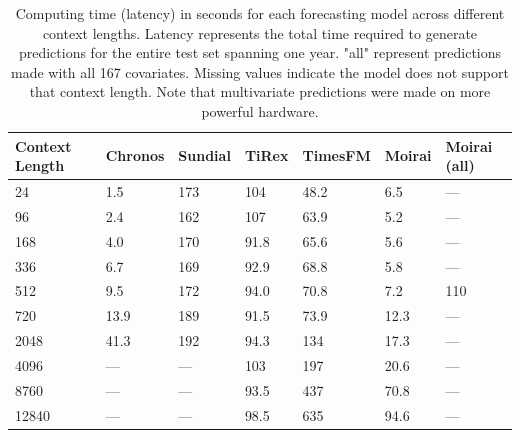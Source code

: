 \begin{table}[H]
\centering
\begin{tabular}{lllllll}
\toprule
\textbf{Context Length} &  \textbf{Chronos} &  \textbf{Sundial} &  \textbf{TiRex} &  \textbf{TimesFM} &  \textbf{Moirai} &  \textbf{Moirai (all)} \\
\midrule
24             & 1.5 & 173 & 104 & 48.2 & 6.5 & {---} \\
96             & 2.4 & 162 & 107 & 63.9 & 5.2 & {---} \\
168            & 4.0 & 170 & 91.8 & 65.6 & 5.6 & {---} \\
336            & 6.7 & 169 & 92.9 & 68.8 & 5.8 & {---} \\
512            & 9.5 & 172 & 94.0 & 70.8 & 7.2 & 110 \\
720            & 13.9 & 189 & 91.5 & 73.9 & 12.3 & {---} \\
2048           & 41.3 & 192 & 94.3 & 134 & 17.3 & {---} \\
4096           & {---} & {---} & 103 & 197 & 20.6 & {---} \\
8760           & {---} & {---} & 93.5 & 437 & 70.8 & {---} \\
12840          & {---} & {---} & 98.5 & 635 & 94.6 & {---} \\
\bottomrule
\end{tabular}
\caption{Computing time (latency) in seconds for each forecasting model across different context lengths. Latency represents the total time required to generate predictions for the entire test set spanning one year. "all" represent predictions made with all 167 covariates. Missing values indicate the model does not support that context length. Note that multivariate predictions were made on more powerful hardware.}
\label{tab:latency_context}
\end{table}
